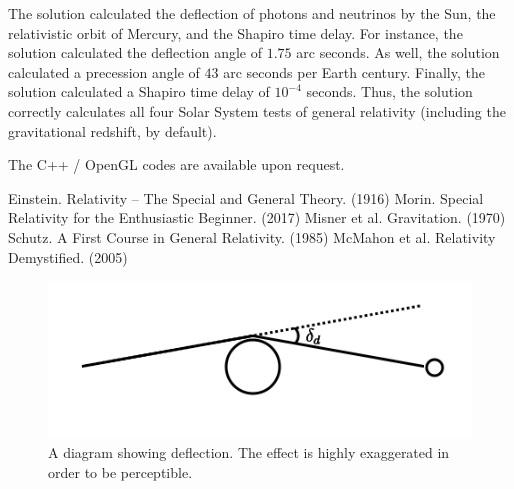 \documentclass[12pt]{article}
\begin{document}
The solution calculated the deflection of photons and neutrinos by the Sun, the relativistic orbit of Mercury, and the Shapiro time delay.
For instance, the solution calculated the deflection angle of $1.75$ arc seconds.
As well, the solution calculated a precession angle of $43$ arc seconds per Earth century.
Finally, the solution calculated a Shapiro time delay of $10^{-4}$ seconds.
Thus, the solution correctly calculates all four Solar System tests of general relativity (including the gravitational redshift, by default).

The C++ / OpenGL codes are available upon request.





\begin{thebibliography}{9}


 Einstein. Relativity -- The Special and General Theory. (1916)
 Morin. Special Relativity for the Enthusiastic Beginner. (2017)
 Misner et al. Gravitation. (1970)
 Schutz. A First Course in General Relativity. (1985)
 McMahon et al. Relativity Demystified. (2005)

\end{thebibliography}


\pagebreak



\begin{figure} 
\centering
\label{fig1}
  \includegraphics[width = 6 in]{deflection.png}
  \caption{ A diagram showing deflection.
The effect is highly exaggerated in order to be perceptible.
}
\end{figure}
\end{document}
